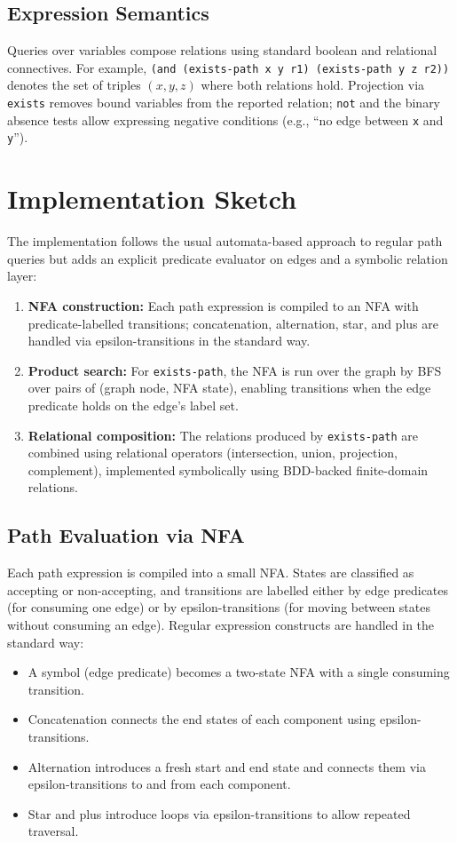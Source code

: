 \documentclass[11pt]{article}
\begin{document}
\subsection{Expression Semantics}

Queries over variables compose relations using standard boolean and relational connectives. For example, \texttt{(and (exists-path x y r1) (exists-path y z r2))} denotes the set of triples $(x,y,z)$ where both relations hold. Projection via \texttt{exists} removes bound variables from the reported relation; \texttt{not} and the binary absence tests allow expressing negative conditions (e.g., ``no edge between \texttt{x} and \texttt{y}'').

\section{Implementation Sketch}

The implementation follows the usual automata-based approach to regular path queries but adds an explicit predicate evaluator on edges and a symbolic relation layer:
\begin{enumerate}[leftmargin=*]
  \item \textbf{NFA construction:} Each path expression is compiled to an NFA with predicate-labelled transitions; concatenation, alternation, star, and plus are handled via epsilon-transitions in the standard way.
  \item \textbf{Product search:} For \texttt{exists-path}, the NFA is run over the graph by BFS over pairs of (graph node, NFA state), enabling transitions when the edge predicate holds on the edge's label set.
  \item \textbf{Relational composition:} The relations produced by \texttt{exists-path} are combined using relational operators (intersection, union, projection, complement), implemented symbolically using BDD-backed finite-domain relations.
\end{enumerate}

\subsection*{Path Evaluation via NFA}

Each path expression is compiled into a small NFA. States are classified as accepting or non-accepting, and transitions are labelled either by edge predicates (for consuming one edge) or by epsilon-transitions (for moving between states without consuming an edge). Regular expression constructs are handled in the standard way:
\begin{itemize}[leftmargin=*]
  \item A symbol (edge predicate) becomes a two-state NFA with a single consuming transition.
  \item Concatenation connects the end states of each component using epsilon-transitions.
  \item Alternation introduces a fresh start and end state and connects them via epsilon-transitions to and from each component.
  \item Star and plus introduce loops via epsilon-transitions to allow repeated traversal.
\end{itemize}
\end{document}
